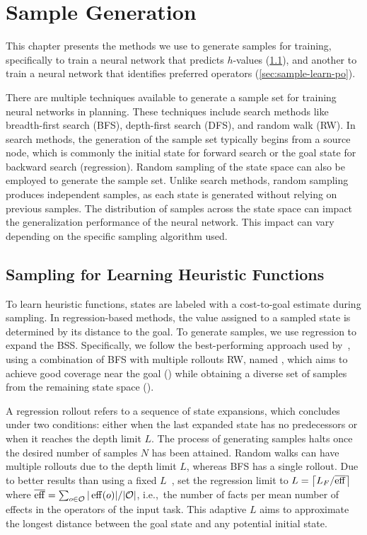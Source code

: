 \documentclass[ppgc,diss,english]{iiufrgs}
\providecommand{\ceil}[1]{\ensuremath{\left\lceil #1\right\rceil}}
\begin{document}
\chapter{Sample Generation}
\label{cha:sample-gen}
This chapter presents the methods we use to generate samples for training, specifically to train a neural network that predicts $h$-values (\cref{sec:sample-learn-h}), and another to train a neural network that identifies preferred operators (\cref{sec:sample-learn-po}).

There are multiple techniques available to generate a sample set for training neural networks in planning. These techniques include search methods like breadth-first search (BFS), depth-first search (DFS), and random walk (RW). In search methods, the generation of the sample set typically begins from a source node, which is commonly the initial state for forward search or the goal state for backward search (regression). Random sampling of the state space can also be employed to generate the sample set. Unlike search methods, random sampling produces independent samples, as each state is generated without relying on previous samples. The distribution of samples across the state space can impact the generalization performance of the neural network. This impact can vary depending on the specific sampling algorithm used.

\section{Sampling for Learning Heuristic Functions}
\label{sec:sample-learn-h}
To learn heuristic functions, states are labeled with a cost-to-goal estimate during sampling. In regression-based methods, the value assigned to a sampled state is determined by its distance to the goal. To generate samples, we use regression to expand the BSS. Specifically, we follow the best-performing approach used by~\citet{Bettker.etal/2022}, using a combination of BFS with multiple rollouts RW, named \bfsrw, which aims to achieve good coverage near the goal (\bfs) while obtaining a diverse set of samples from the remaining state space (\rw).

A regression rollout refers to a sequence of state expansions, which concludes under two conditions: either when the last expanded state has no predecessors or when it reaches the depth limit $L$. The process of generating samples halts once the desired number of samples $N$ has been attained. Random walks can have multiple rollouts due to the depth limit $L$, whereas BFS has a single rollout.
Due to better results than using a fixed $L$~\cite{Yu.etal/2020, OToole/2022}, \citet{Bettker.etal/2022} set the regression limit to $L=\ceil{\facts/\overline{\eff}}$ where $\overline{\operatorname{eff}}=\sum_{o\in \mathcal{O}} |\operatorname{eff}(o)|/|\mathcal{O}|$, i.e.,~the number of facts per mean number of effects in the operators of the input task. This adaptive $L$ aims to approximate the longest distance \distfarthest between the goal state and any potential initial state.
\end{document}
